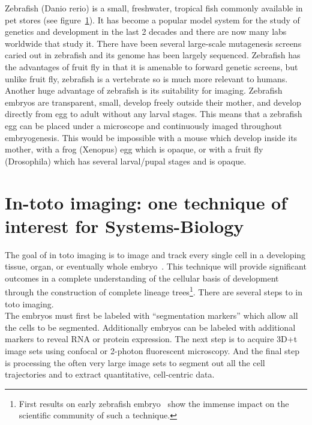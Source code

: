 Zebrafish (Danio rerio) is a small, freshwater, tropical fish commonly available
in pet stores (see figure~\ref{}). It has become a popular model system for the
study of genetics and development in the last 2 decades and there are now
many labs worldwide that study it. There have been several
large-scale mutagenesis screens caried out in zebrafish and its genome has been
largely sequenced. Zebrafish has the advantages of fruit fly in that it
is amenable to forward genetic screens, but unlike fruit fly, zebrafish is a
vertebrate so is much more relevant to humans. Another huge advantage
of zebrafish is its suitability for imaging. Zebrafish embryos are transparent,
small, develop freely outside their mother, and develop directly from egg to
adult without any larval stages. This means that a zebrafish egg can be placed
under a microscope and continuously imaged throughout embryogenesis. This would
be impossible with a mouse which develop inside its mother, with a frog
(Xenopus) egg which is opaque, or with a fruit fly (Drosophila) which has
several larval/pupal stages and is opaque.


\section{In-toto imaging: one technique of interest for Systems-Biology}

The goal of in toto imaging is to image and track every single cell in a
developing tissue, organ, or eventually
whole embryo~\cite{megason2003digitizing}. This technique will provide
significant outcomes in a complete understanding of the cellular basis of
development through the construction of complete lineage trees\footnote{First
results on early zebrafish embryo~\cite{SCIENCE-PAPER} show the immense impact
on the scientific community of such a technique.}. There are several steps to in
toto imaging.\\

The embryos must first be labeled with “segmentation markers” which allow all
the cells to be segmented. Additionally embryos can be labeled with additional
markers to reveal RNA or protein expression. The next step is to acquire 3D+t
image sets using confocal or 2-photon fluorescent microscopy. And the final step
is processing the often very large image sets to segment out all the cell
trajectories and to extract quantitative, cell-centric data.

